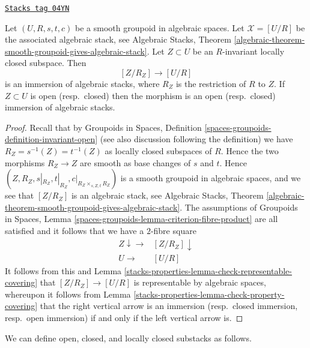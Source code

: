 \begin{lemma}
\label{stacks-properties-lemma-immersion-presentation}
\href{https://stacks.math.columbia.edu/tag/04YN}{\texttt{Stacks tag 04YN}}

Let $(U, R, s, t, c)$ be a smooth groupoid in algebraic spaces.
Let $\mathcal{X} = [U/R]$ be the associated algebraic stack, see
Algebraic Stacks,
Theorem \ref{algebraic-theorem-smooth-groupoid-gives-algebraic-stack}.
Let $Z \subset U$ be an $R$-invariant locally closed subspace. Then
$$
[Z/R_Z] \longrightarrow [U/R]
$$
is an immersion of algebraic stacks, where $R_Z$ is the restriction
of $R$ to $Z$. If $Z \subset U$ is open (resp.\ closed) then the morphism
is an open (resp.\ closed) immersion of algebraic stacks.
\end{lemma}

\begin{proof}
Recall that by
Groupoids in Spaces,
Definition \ref{spaces-groupoids-definition-invariant-open}
(see also discussion following the definition)
we have $R_Z = s^{-1}(Z) = t^{-1}(Z)$ as locally closed subspaces
of $R$. Hence the two morphisms $R_Z \to Z$ are smooth as base changes
of $s$ and $t$. Hence
$(Z, R_Z, s|_{R_Z}, t|_{R_Z}, c|_{R_Z \times_{s, Z, t} R_Z})$ is
a smooth groupoid in algebraic spaces, and we see that
$[Z/R_Z]$ is an algebraic stack, see
Algebraic Stacks,
Theorem \ref{algebraic-theorem-smooth-groupoid-gives-algebraic-stack}.
The assumptions of
Groupoids in Spaces,
Lemma \ref{spaces-groupoids-lemma-criterion-fibre-product}
are all satisfied and it follows that we have a $2$-fibre square
$$
\begin{array}{cc}Z \downarrow\longrightarrow & [Z/R_Z] \downarrow \\ U \longrightarrow & [U/R]\end{array}
$$
It follows from this and
Lemma \ref{stacks-properties-lemma-check-representable-covering}
that $[Z/R_Z] \to [U/R]$ is representable by algebraic spaces,
whereupon it follows from
Lemma \ref{stacks-properties-lemma-check-property-covering}
that the right vertical arrow is an immersion (resp.\ closed immersion,
resp.\ open immersion) if and only if the left vertical arrow is.
\end{proof}

We can define open, closed, and locally closed substacks as follows.

